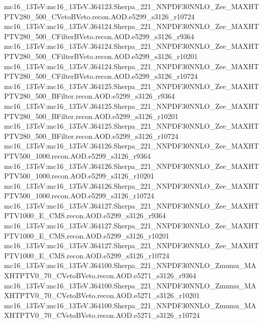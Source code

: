 { mc16\_13TeV:mc16\_13TeV.364123.Sherpa\_221\_NNPDF30NNLO\_Zee\_MAXHTPTV280\_500\_CVetoBVeto.recon.AOD.e5299\_s3126\_r10724 \newline    
 mc16\_13TeV:mc16\_13TeV.364124.Sherpa\_221\_NNPDF30NNLO\_Zee\_MAXHTPTV280\_500\_CFilterBVeto.recon.AOD.e5299\_s3126\_r9364 \newline   
 mc16\_13TeV:mc16\_13TeV.364124.Sherpa\_221\_NNPDF30NNLO\_Zee\_MAXHTPTV280\_500\_CFilterBVeto.recon.AOD.e5299\_s3126\_r10201   \newline  
 mc16\_13TeV:mc16\_13TeV.364124.Sherpa\_221\_NNPDF30NNLO\_Zee\_MAXHTPTV280\_500\_CFilterBVeto.recon.AOD.e5299\_s3126\_r10724 \newline    
 mc16\_13TeV:mc16\_13TeV.364125.Sherpa\_221\_NNPDF30NNLO\_Zee\_MAXHTPTV280\_500\_BFilter.recon.AOD.e5299\_s3126\_r9364  \newline   
 mc16\_13TeV:mc16\_13TeV.364125.Sherpa\_221\_NNPDF30NNLO\_Zee\_MAXHTPTV280\_500\_BFilter.recon.AOD.e5299\_s3126\_r10201 \newline    
 mc16\_13TeV:mc16\_13TeV.364125.Sherpa\_221\_NNPDF30NNLO\_Zee\_MAXHTPTV280\_500\_BFilter.recon.AOD.e5299\_s3126\_r10724  \newline   
 mc16\_13TeV:mc16\_13TeV.364126.Sherpa\_221\_NNPDF30NNLO\_Zee\_MAXHTPTV500\_1000.recon.AOD.e5299\_s3126\_r9364 \newline     
 mc16\_13TeV:mc16\_13TeV.364126.Sherpa\_221\_NNPDF30NNLO\_Zee\_MAXHTPTV500\_1000.recon.AOD.e5299\_s3126\_r10201 \newline    
 mc16\_13TeV:mc16\_13TeV.364126.Sherpa\_221\_NNPDF30NNLO\_Zee\_MAXHTPTV500\_1000.recon.AOD.e5299\_s3126\_r10724   \newline  
 mc16\_13TeV:mc16\_13TeV.364127.Sherpa\_221\_NNPDF30NNLO\_Zee\_MAXHTPTV1000\_E\_CMS.recon.AOD.e5299\_s3126\_r9364  \newline   
 mc16\_13TeV:mc16\_13TeV.364127.Sherpa\_221\_NNPDF30NNLO\_Zee\_MAXHTPTV1000\_E\_CMS.recon.AOD.e5299\_s3126\_r10201 \newline    
 mc16\_13TeV:mc16\_13TeV.364127.Sherpa\_221\_NNPDF30NNLO\_Zee\_MAXHTPTV1000\_E\_CMS.recon.AOD.e5299\_s3126\_r10724 \newline    
 mc16\_13TeV:mc16\_13TeV.364100.Sherpa\_221\_NNPDF30NNLO\_Zmumu\_MAXHTPTV0\_70\_CVetoBVeto.recon.AOD.e5271\_s3126\_r9364 \newline    
 mc16\_13TeV:mc16\_13TeV.364100.Sherpa\_221\_NNPDF30NNLO\_Zmumu\_MAXHTPTV0\_70\_CVetoBVeto.recon.AOD.e5271\_s3126\_r10201 \newline    
 mc16\_13TeV:mc16\_13TeV.364100.Sherpa\_221\_NNPDF30NNLO\_Zmumu\_MAXHTPTV0\_70\_CVetoBVeto.recon.AOD.e5271\_s3126\_r10724 \newline    
}

